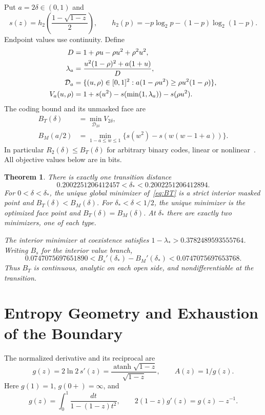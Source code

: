 \documentclass[12pt,letterpaper,onecolumn]{article}
\newtheorem{theorem}{Theorem}
\theoremstyle{definition}
\newcommand{\atanh}{\operatorname{atanh}}
\begin{document}
Put \(a=2\delta\in(0,1)\) and
\[
s(z)=h_2\!\left(\frac{1-\sqrt{1-z}}2\right),\qquad
h_2(p)=-p\log_2p-(1-p)\log_2(1-p).
\]
Endpoint values use continuity. Define
\begin{align}
D&=1+\rho u-\rho u^2+\rho^2u^2,\notag\\
\lambda_a&=\frac{u^2(1-\rho)^2+a(1+u)}{D},\label{eq:lambda}\\
\mathcal D_a&=\{(u,\rho)\in[0,1]^2:
a(1-\rho u^2)\ge\rho u^2(1-\rho)\},\notag\\
V_a(u,\rho)&=1+s(u^2)-s(\min(1,\lambda_a))-s(\rho u^2).\label{eq:objective}
\end{align}
The coding bound and its unmasked face are
\begin{align}
B_T(\delta)&=\min_{\mathcal D_{2\delta}}V_{2\delta},\label{eq:BT}\\
B_M(a/2)&=\min_{1-a\le w\le1}
\{s(w^2)-s(w(w-1+a))\}.\label{eq:BM}
\end{align}
In particular \(R_2(\delta)\le B_T(\delta)\) for arbitrary binary codes, linear or nonlinear~\cite{AlrabiahGuruswami2026}. All objective values below are in bits.

\begin{theorem}\label{thm:main}
There is exactly one transition distance
\[
0.2002251206412457<\delta_*<0.2002251206412894.
\]
For \(0<\delta<\delta_*\), the unique global minimizer of~\eqref{eq:BT} is a strict interior masked point and \(B_T(\delta)<B_M(\delta)\). For \(\delta_*<\delta<1/2\), the unique minimizer is the optimized face point and \(B_T(\delta)=B_M(\delta)\). At \(\delta_*\) there are exactly two minimizers, one of each type.

The interior minimizer at coexistence satisfies
\(1-\lambda_*>0.3782489593555764\).
Writing \(B_s\) for the interior value branch,
\[
0.0747075697651890<B_s'(\delta_*)-B_M'(\delta_*)
<0.0747075697653768.
\]
Thus \(B_T\) is continuous, analytic on each open side, and nondifferentiable at the transition.
\end{theorem}

\section{Entropy Geometry and Exhaustion of the Boundary}
The normalized derivative and its reciprocal are
\[
g(z)=2\ln2\,s'(z)=\frac{\atanh\sqrt{1-z}}{\sqrt{1-z}},
\qquad A(z)=1/g(z).
\]
Here \(g(1)=1\), \(g(0+)=\infty\), and
\begin{equation}\label{eq:g}
g(z)=\int_0^1\frac{dt}{1-(1-z)t^2},\qquad
2(1-z)g'(z)=g(z)-z^{-1}.
\end{equation}
\end{document}
